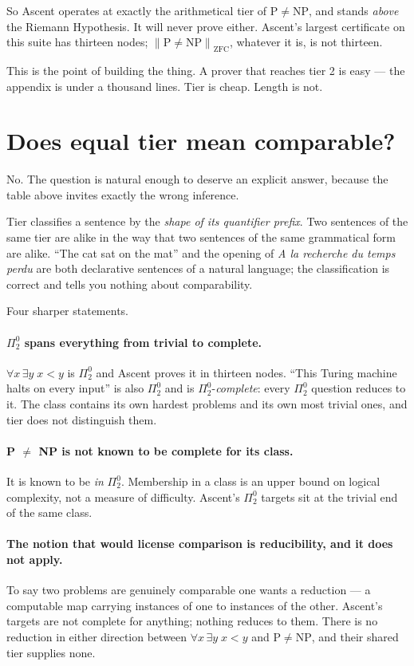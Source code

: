 \documentclass[11pt,a4paper]{article}
\newcommand{\Pai}[2]{\Pi^{#1}_{#2}}
\newcommand{\shortest}[1]{\left\lVert #1 \right\rVert}
\begin{document}
So Ascent operates at exactly the arithmetical tier of $\mathrm{P} \neq
\mathrm{NP}$, and stands \emph{above} the Riemann Hypothesis. It will never
prove either. Ascent's largest certificate on this suite has thirteen nodes;
$\shortest{\mathrm{P} \neq \mathrm{NP}}_{\mathrm{ZFC}}$, whatever it is, is not
thirteen.

This is the point of building the thing. A prover that reaches tier 2 is easy
--- the appendix is under a thousand lines. Tier is cheap. Length is not.

\section{Does equal tier mean comparable?}\label{sec:comparable}

No. The question is natural enough to deserve an explicit answer, because the
table above invites exactly the wrong inference.

Tier classifies a sentence by the \emph{shape of its quantifier prefix}. Two
sentences of the same tier are alike in the way that two sentences of the same
grammatical form are alike. ``The cat sat on the mat'' and the opening of
\emph{A la recherche du temps perdu} are both declarative sentences of a
natural language; the classification is correct and tells you nothing about
comparability.

Four sharper statements.

\paragraph{$\Pai{0}{2}$ spans everything from trivial to complete.}
$\forall x\, \exists y\; x < y$ is $\Pai{0}{2}$ and Ascent proves it in
thirteen nodes. ``This Turing machine halts on every input'' is also
$\Pai{0}{2}$ and is $\Pai{0}{2}$-\emph{complete}: every $\Pai{0}{2}$ question
reduces to it. The class contains its own hardest problems and its own most
trivial ones, and tier does not distinguish them.

\paragraph{P $\neq$ NP is not known to be complete for its class.} It is known
to be \emph{in} $\Pai{0}{2}$. Membership in a class is an upper bound on
logical complexity, not a measure of difficulty. Ascent's $\Pai{0}{2}$ targets
sit at the trivial end of the same class.

\paragraph{The notion that would license comparison is reducibility, and it
does not apply.} To say two problems are genuinely comparable one wants a
reduction --- a computable map carrying instances of one to instances of the
other. Ascent's targets are not complete for anything; nothing reduces to
them. There is no reduction in either direction between $\forall x\,\exists
y\; x<y$ and $\mathrm{P} \neq \mathrm{NP}$, and their shared tier supplies
none.
\end{document}
